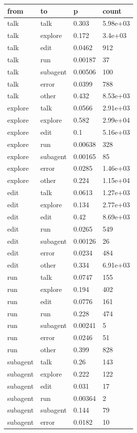 \begin{tabular}{llll}
\toprule
from & to & p & count \\
\midrule
talk & talk & 0.303 & 5.98e+03 \\
talk & explore & 0.172 & 3.4e+03 \\
talk & edit & 0.0462 & 912 \\
talk & run & 0.00187 & 37 \\
talk & subagent & 0.00506 & 100 \\
talk & error & 0.0399 & 788 \\
talk & other & 0.432 & 8.53e+03 \\
explore & talk & 0.0566 & 2.91e+03 \\
explore & explore & 0.582 & 2.99e+04 \\
explore & edit & 0.1 & 5.16e+03 \\
explore & run & 0.00638 & 328 \\
explore & subagent & 0.00165 & 85 \\
explore & error & 0.0285 & 1.46e+03 \\
explore & other & 0.224 & 1.15e+04 \\
edit & talk & 0.0613 & 1.27e+03 \\
edit & explore & 0.134 & 2.77e+03 \\
edit & edit & 0.42 & 8.69e+03 \\
edit & run & 0.0265 & 549 \\
edit & subagent & 0.00126 & 26 \\
edit & error & 0.0234 & 484 \\
edit & other & 0.334 & 6.91e+03 \\
run & talk & 0.0747 & 155 \\
run & explore & 0.194 & 402 \\
run & edit & 0.0776 & 161 \\
run & run & 0.228 & 474 \\
run & subagent & 0.00241 & 5 \\
run & error & 0.0246 & 51 \\
run & other & 0.399 & 828 \\
subagent & talk & 0.26 & 143 \\
subagent & explore & 0.222 & 122 \\
subagent & edit & 0.031 & 17 \\
subagent & run & 0.00364 & 2 \\
subagent & subagent & 0.144 & 79 \\
subagent & error & 0.0182 & 10 \\

\end{tabular}
